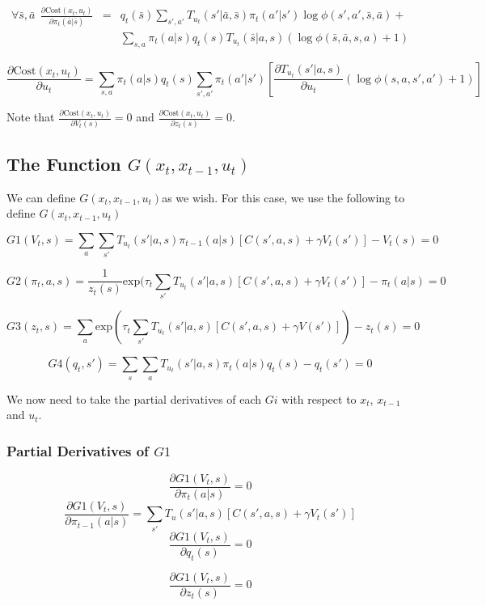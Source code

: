 \documentclass{article}
\newcommand{\ct}{\ensuremath{\mathrm{Cost}(x_t,u_t)}}
\newcommand{\G}{\ensuremath{G(x_t,x_{t-1},u_t)}}
\newcommand{\Tu}{\ensuremath{T_{u_t}(s'|a,s)}}
\begin{document}
\begin{eqnarray*}
\forall \bar{s},\bar{a}\ \  \frac{\partial \ct}{\partial \pi_t(\bar{a}|\bar{s})}&=& 
q_t(\bar{s})\sum_{s',a'}T_{u_t}(s'|\bar{a},\bar{s})\pi_t(a'|s')\log \phi(s',a',\bar{s},\bar{a})+\\
&&\sum_{s,a}\pi_t(a|s)q_t(s)T_{u_t}(\bar{s}|a,s)(\log \phi(\bar{s},\bar{a},s,a)+1)
\end{eqnarray*}

\[
\frac{\partial \ct}{\partial u_t}=\sum_{s,a}\pi_t(a|s)q_t(s)\sum_{s',a'}\pi_t(a'|s')\left[ \frac{\partial \Tu}{\partial u_t} (\log \phi(s,a,s',a')+1) \right]
\]

Note that $\frac{\partial \ct}{\partial V_t(s)}=0$ and $\frac{\partial \ct}{\partial z_t(s)}=0$.

\subsection*{The Function \G}
We can define \G as we wish.
For this case, we use the following to define \G

\[
G1(V_t,s)=\sum_a\sum_{s'} \Tu\pi_{t-1}(a|s)\left[C(s',a,s)+\gamma V_t(s')\right]-V_t(s)=0
\]

\[
G2(\pi_t,a,s)=\frac{1}{z_t(s)}\mathrm{exp}(\tau_t\sum_{s'}\Tu \left[C(s',a,s)+\gamma V_t(s')\right]-\pi_t(a|s)=0
\]

\[
G3(z_t,s)=\sum_a\mathrm{exp}(\tau_t\sum_{s'}\Tu\left[C(s',a,s)+\gamma V(s')\right])-z_t(s)=0
\]

\[
G4(q_t,s')=\sum_s\sum_a \Tu\pi_t(a|s)q_t(s)-q_t(s')=0
\]

We now need to take the partial derivatives of each $Gi$ with respect to $x_t$, $x_{t-1}$ and $u_t$.

\subsubsection*{Partial Derivatives of $G1$}

\[
\frac{\partial G1(V_t,s)}{\partial \pi_t(a|s)}=0
\]
\[
\frac{\partial G1(V_t,s)}{\partial \pi_{t-1}(a|s)}=\sum_{s'}T_u(s'|a,s)\left[C(s',a,s)+\gamma V_t(s')\right]
\]
\[
\frac{\partial G1(V_t,s)}{\partial q_t(s)}=0
\]

\[
\frac{\partial G1(V_t,s)}{\partial z_t(s)}=0
\]
\end{document}
